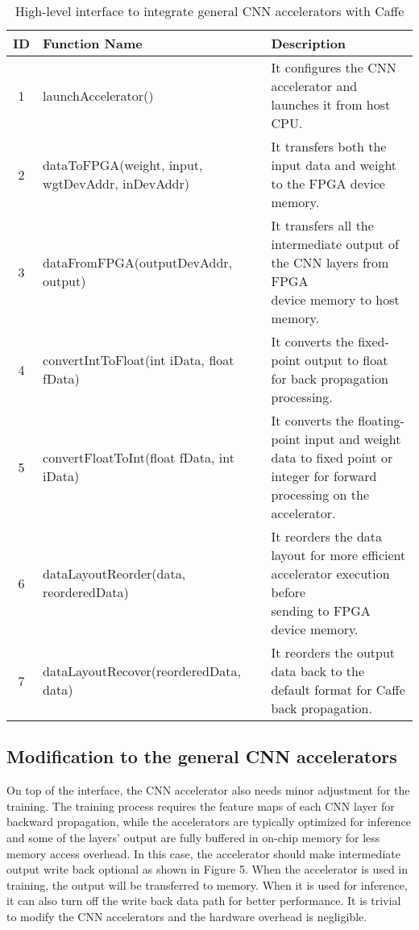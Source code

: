 \begin{table*}
        \centering
        \vspace{-0.3em}
        \caption{High-level interface to integrate general CNN accelerators with Caffe}
        \label{tab:graph}
        \vspace{-0.3em}
        \begin{tabular}{c|l|l}
                \toprule
                ID & Function Name & Description  \\
                \midrule
                1 & launchAccelerator() & It configures the CNN accelerator and launches it from host CPU. \\
		\midrule
                2 & dataToFPGA(weight, input, wgtDevAddr, inDevAddr) & It transfers both the input data and weight to the FPGA device memory. \\
		\midrule
		3 & dataFromFPGA(outputDevAddr, output) & \shortstack[l]{It transfers all the intermediate output of the CNN layers from FPGA \\device memory to host memory.} \\
		\midrule
		4 & convertIntToFloat(int iData, float fData) & It converts the fixed-point output to float for back propagation processing. \\
		\midrule
		5 & convertFloatToInt(float fData,  int iData) & \shortstack[l]{It converts the floating-point input and weight data to fixed point or \\integer for forward processing on the accelerator.} \\
		\midrule
		6 & dataLayoutReorder(data, reorderedData) & \shortstack[l]{It reorders the data layout for more efficient accelerator execution before \\sending to FPGA device memory.} \\
		\midrule
		7 & dataLayoutRecover(reorderedData, data) & It reorders the output data back to the default format for Caffe back propagation. \\
                \bottomrule
        \end{tabular}
        \vspace{-1em}
\end{table*}

\subsection{Modification to the general CNN accelerators}
  On top of the interface, the CNN accelerator also needs minor adjustment for the training. 
The training process requires the feature maps of each CNN layer for backward propagation, 
while the accelerators are typically optimized for inference and some of the layers’ output 
are fully buffered in on-chip memory for less memory access overhead. In this case, 
the accelerator should make intermediate output write back optional as shown in Figure 5. 
When the accelerator is used in training, the output will be transferred to memory. 
When it is used for inference, it can also turn off the write back data path for better performance. 
It is trivial to modify the CNN accelerators and the hardware overhead is negligible.

